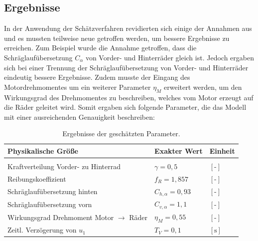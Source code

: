 \subsection{Ergebnisse}
In der Anwendung der Schätzverfahren revidierten sich einige der Annahmen aus \cite{VikAnd} und es mussten teilweise neue getroffen werden, um bessere Ergebnisse zu erreichen. Zum Beispiel wurde die Annahme getroffen, dass die Schräglaufübersetzung $C_{\alpha}$ von Vorder- und Hinterräder gleich ist. Jedoch ergaben sich bei einer Trennung der Schräglaufübersetzung von Vorder- und Hinterräder eindeutig bessere Ergebnisse. Zudem musste der Eingang des Motordrehmomentes um ein weiterer Parameter $\eta_M$ erweitert werden, um den Wirkungsgrad des Drehmomentes zu beschreiben, welches vom Motor erzeugt auf die Räder geleitet wird. Somit ergaben sich folgende Parameter, die das Modell mit einer ausreichenden Genauigkeit beschreiben: 
\begin{table}[H]
\centering
\begin{tabularx}{\columnwidth}{m{7cm}|m{4cm}|X}
  \textbf{Physikalische Größe} & \textbf{Exakter Wert}& \textbf{Einheit}\\\hline\hline 
	\rule{0pt}{1mm} & &\\
	Kraftverteilung Vorder- zu Hinterrad& $\gamma=0,5$ & $[\text{-}]$\\
	Reibungskoeffizient& $f_R=1,857$ & $[\text{-}]$\\
	Schräglaufübersetzung hinten& $C_{h,\alpha}=0,93$ & $[\text{-}]$\\
  	Schräglaufübersetzung vorn& $C_{v,\alpha}=1,1$ & $[\text{-}]$\\
  	Wirkungsgrad Drehmoment Motor $\rightarrow$ Räder& $\eta_M=0,55$ & $[\text{-}]$\\
	Zeitl. Verzögerung von $u_{1}$& $T_{V}=0,1$ & $[\text{s}]$
\end{tabularx}
\caption{Ergebnisse der geschätzten Parameter. \label{tab:ParSch}}
\end{table} 

